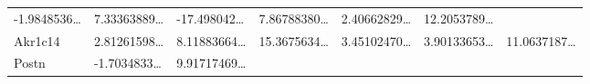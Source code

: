 \documentclass[
]{article}
\begin{document}
\begin{longtable}[]{@{}lllllll@{}}
\begin{minipage}[t]{0.12\columnwidth}
-1.9848536\ldots{}\strut
\end{minipage} & \begin{minipage}[t]{0.12\columnwidth}\raggedright
7.33363889\ldots{}\strut
\end{minipage} & \begin{minipage}[t]{0.12\columnwidth}\raggedright
-17.498042\ldots{}\strut
\end{minipage} & \begin{minipage}[t]{0.12\columnwidth}\raggedright
7.86788380\ldots{}\strut
\end{minipage} & \begin{minipage}[t]{0.12\columnwidth}\raggedright
2.40662829\ldots{}\strut
\end{minipage} & \begin{minipage}[t]{0.12\columnwidth}\raggedright
12.2053789\ldots{}\strut
\end{minipage}\tabularnewline
\begin{minipage}[t]{0.08\columnwidth}\raggedright
Akr1c14\strut
\end{minipage} & \begin{minipage}[t]{0.12\columnwidth}\raggedright
2.81261598\ldots{}\strut
\end{minipage} & \begin{minipage}[t]{0.12\columnwidth}\raggedright
8.11883664\ldots{}\strut
\end{minipage} & \begin{minipage}[t]{0.12\columnwidth}\raggedright
15.3675634\ldots{}\strut
\end{minipage} & \begin{minipage}[t]{0.12\columnwidth}\raggedright
3.45102470\ldots{}\strut
\end{minipage} & \begin{minipage}[t]{0.12\columnwidth}\raggedright
3.90133653\ldots{}\strut
\end{minipage} & \begin{minipage}[t]{0.12\columnwidth}\raggedright
11.0637187\ldots{}\strut
\end{minipage}\tabularnewline
\begin{minipage}[t]{0.08\columnwidth}\raggedright
Postn\strut
\end{minipage} & \begin{minipage}[t]{0.12\columnwidth}\raggedright
-1.7034833\ldots{}\strut
\end{minipage} & \begin{minipage}[t]{0.12\columnwidth}\raggedright
9.91717469\ldots{}\strut

\end{minipage}
\end{longtable}
\end{document}
